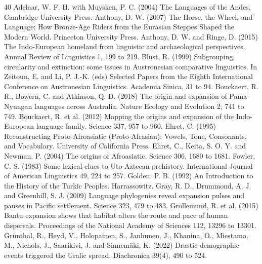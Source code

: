 \documentclass[11pt,a4paper]{article}
\begin{document}
\begin{thebibliography}{40}
 Adelaar, W. F. H. with Muysken, P. C. (2004) The Languages of the Andes. Cambridge University Press.
 Anthony, D. W. (2007) The Horse, the Wheel, and Language: How Bronze-Age Riders from the Eurasian Steppes Shaped the Modern World. Princeton University Press.
 Anthony, D. W. and Ringe, D. (2015) The Indo-European homeland from linguistic and archaeological perspectives. Annual Review of Linguistics 1, 199 to 219.
 Blust, R. (1999) Subgrouping, circularity and extinction: some issues in Austronesian comparative linguistics. In Zeitoun, E. and Li, P. J.-K. (eds) Selected Papers from the Eighth International Conference on Austronesian Linguistics. Academia Sinica, 31 to 94.
 Bouckaert, R. R., Bowern, C. and Atkinson, Q. D. (2018) The origin and expansion of Pama-Nyungan languages across Australia. Nature Ecology and Evolution 2, 741 to 749.
 Bouckaert, R. et al. (2012) Mapping the origins and expansion of the Indo-European language family. Science 337, 957 to 960.
 Ehret, C. (1995) Reconstructing Proto-Afroasiatic (Proto-Afrasian): Vowels, Tone, Consonants, and Vocabulary. University of California Press.
 Ehret, C., Keita, S. O. Y. and Newman, P. (2004) The origins of Afroasiatic. Science 306, 1680 to 1681.
 Fowler, C. S. (1983) Some lexical clues to Uto-Aztecan prehistory. International Journal of American Linguistics 49, 224 to 257.
 Golden, P. B. (1992) An Introduction to the History of the Turkic Peoples. Harrassowitz.
 Gray, R. D., Drummond, A. J. and Greenhill, S. J. (2009) Language phylogenies reveal expansion pulses and pauses in Pacific settlement. Science 323, 479 to 483.
 Grollemund, R. et al. (2015) Bantu expansion shows that habitat alters the route and pace of human dispersals. Proceedings of the National Academy of Sciences 112, 13296 to 13301.
 Grünthal, R., Heyd, V., Holopainen, S., Janhunen, J., Khanina, O., Miestamo, M., Nichols, J., Saarikivi, J. and Sinnemäki, K. (2022) Drastic demographic events triggered the Uralic spread. Diachronica 39(4), 490 to 524.

\end{thebibliography}
\end{document}
